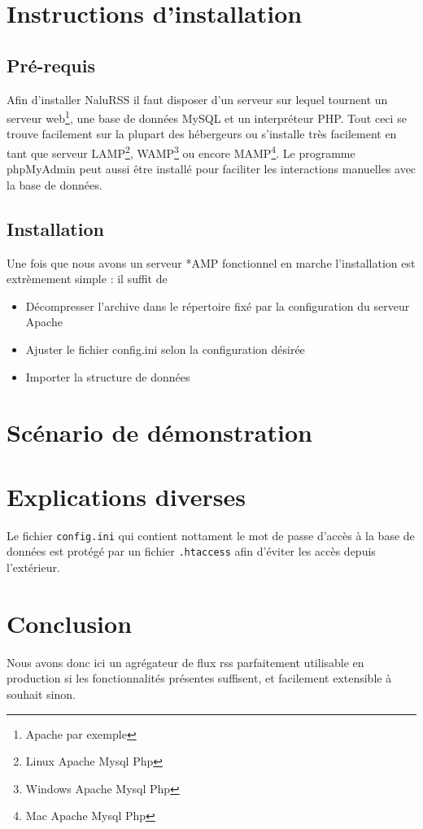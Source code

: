 \documentclass[11pt]{article}
\begin{document}
\section{Instructions d'installation}
\subsection{Pré-requis}
Afin d'installer NaluRSS il faut disposer d'un serveur sur lequel tournent un serveur web\footnote{Apache par exemple}, une base de données MySQL et un interpréteur PHP. Tout ceci se trouve facilement sur la plupart des hébergeurs ou s'installe très facilement en tant que serveur LAMP\footnote{Linux Apache Mysql Php}, WAMP\footnote{Windows Apache Mysql Php} ou encore MAMP\footnote{Mac Apache Mysql Php}. Le programme phpMyAdmin peut aussi être installé pour faciliter les interactions manuelles avec la base de données.
\subsection{Installation}
Une fois que nous avons un serveur *AMP fonctionnel en marche l'installation est extrèmement simple : il suffit de 
\begin{itemize}
\item{Décompresser l'archive dans le répertoire fixé par la configuration du serveur Apache}
\item{Ajuster le fichier config.ini selon la configuration désirée}
\item{Importer la structure de données}
\end{itemize}

\section{Scénario de démonstration}

\section{Explications diverses}
Le fichier \verb|config.ini| qui contient nottament le mot de passe d'accès à la base de données est protégé par un fichier \verb|.htaccess| afin d'éviter les accès depuis l'extérieur.

\section{Conclusion}
Nous avons donc ici un agrégateur de flux rss parfaitement utilisable en production si les fonctionnalités présentes suffisent, et facilement extensible à souhait sinon.
\end{document}
